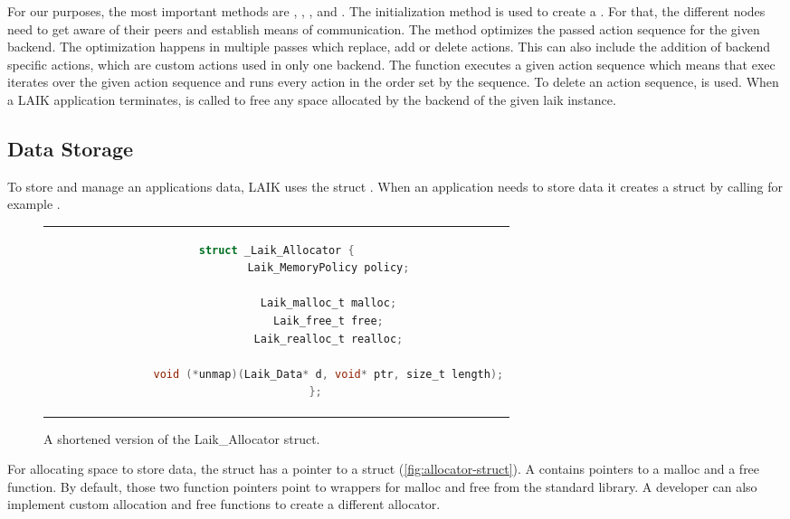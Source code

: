 For our purposes, the most important methods are , , ,  and . 
The initialization method is used to create a . 
For that, the different nodes need to get aware of their peers and establish means of communication. 
The method  optimizes the  passed action sequence for the given backend.
The optimization happens in multiple passes which replace, add or delete actions. 
This can also include the addition of backend specific actions, which are custom actions used in only one backend. 
The  function executes a given action sequence which means that exec iterates over the given action sequence and runs every action in the order set by the sequence. 
To delete an action sequence,  is used.
When a LAIK application terminates,  is called to free any space allocated by the backend of the given laik instance.

\subsection{Data Storage}

To store and manage an applications data, LAIK uses the struct .
When an application needs to store data it creates a  struct by calling for example .

\begin{figure}[htpb]
	\centering
	\begin{tabular}{c}
		\begin{lstlisting}[language=C]
			struct _Laik_Allocator {
				Laik_MemoryPolicy policy;
				
				Laik_malloc_t malloc;
				Laik_free_t free;
				Laik_realloc_t realloc;
				
				void (*unmap)(Laik_Data* d, void* ptr, size_t length);
			};
		\end{lstlisting}
	\end{tabular}
	\caption[Laik allocator struct]{A shortened version of the Laik\_Allocator struct.}
	\label{fig:allocator-struct}
\end{figure}

For allocating space to store data, the  struct has a pointer to a  struct (\autoref{fig:allocator-struct}). 
A  contains pointers to a malloc and a free function. 
By default, those two function pointers point to wrappers for malloc and free from the standard library. 
A developer can also implement custom allocation and free functions to create a different allocator.


